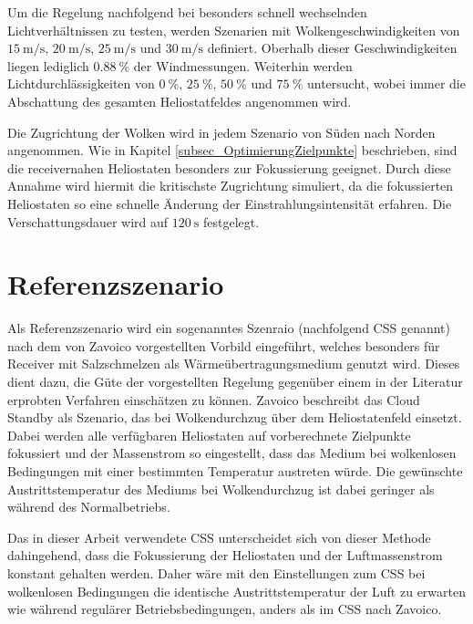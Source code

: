 Um die Regelung nachfolgend bei besonders schnell wechselnden Lichtverhältnissen zu testen, werden Szenarien mit Wolkengeschwindigkeiten von $\SI{15}{\metre\per\second}$, $\SI{20}{\metre\per\second}$, $\SI{25}{\metre\per\second}$ und $\SI{30}{\metre\per\second}$ definiert.
Oberhalb dieser Geschwindigkeiten liegen lediglich $\SI{0.88}{\percent}$ der Windmessungen.
Weiterhin werden Lichtdurchlässigkeiten von $\SI{0}{\percent}$, $\SI{25}{\percent}$, $\SI{50}{\percent}$ und $\SI{75}{\percent}$ untersucht, wobei immer die Abschattung des gesamten Heliostatfeldes angenommen wird.

Die Zugrichtung der Wolken wird in jedem Szenario von Süden nach Norden angenommen.
Wie in Kapitel \ref{subsec_OptimierungZielpunkte} beschrieben, sind die receivernahen Heliostaten besonders zur Fokussierung geeignet.
Durch diese Annahme wird hiermit die kritischste Zugrichtung simuliert, da die fokussierten Heliostaten so eine schnelle Änderung der Einstrahlungsintensität erfahren.
Die Verschattungsdauer wird auf $\SI{120}{\second}$ festgelegt.

\section{Referenzszenario} \label{sec_Referenzszenario}
Als Referenzszenario wird ein sogenanntes  Szenraio (nachfolgend CSS genannt) nach dem von Zavoico \cite[S.25ff]{Zavoico} vorgestellten Vorbild eingeführt, welches besonders für Receiver mit Salzschmelzen als Wärmeübertragungsmedium genutzt wird.
Dieses dient dazu, die Güte der vorgestellten Regelung gegenüber einem in der Literatur erprobten Verfahren einschätzen zu können.
Zavoico beschreibt das Cloud Standby als Szenario, das bei Wolkendurchzug über dem Heliostatenfeld einsetzt.
Dabei werden alle verfügbaren Heliostaten auf vorberechnete Zielpunkte fokussiert und der Massenstrom so eingestellt, dass das Medium bei wolkenlosen Bedingungen mit einer bestimmten Temperatur austreten würde.
Die gewünschte Austrittstemperatur des Mediums bei Wolkendurchzug ist dabei geringer als während des Normalbetriebs.

Das in dieser Arbeit verwendete CSS unterscheidet sich von dieser Methode dahingehend, dass die Fokussierung der Heliostaten und der Luftmassenstrom konstant gehalten werden.
Daher wäre mit den Einstellungen zum CSS bei wolkenlosen Bedingungen die identische Austrittstemperatur der Luft zu erwarten wie während regulärer Betriebsbedingungen, anders als im CSS nach Zavoico.

